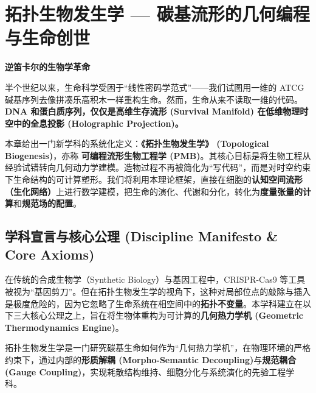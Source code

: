 \chapter{拓扑生物发生学 — 碳基流形的几何编程与生命创世}
\label{chp:topological_biogenesis}

\begin{bquote}
    \textbf{逆笛卡尔的生物学革命}

    \vspace{1em}半个世纪以来，生命科学受困于“线性密码学范式”——我们试图用一维的 ATCG 碱基序列去像拼凑乐高积木一样重构生命。然而，生命从来不读取一维的代码。\textbf{DNA 和蛋白质序列，仅仅是高维生存流形 (Survival Manifold) 在低维物理时空中的全息投影 (Holographic Projection)。}

    \vspace{1em}本章给出一门新学科的系统化定义：\textbf{《拓扑生物发生学》 (Topological Biogenesis)}，亦称 \textbf{可编程流形生物工程学 (PMB)}。其核心目标是将生物工程从经验试错转向几何动力学建模。造物过程不再被简化为“写代码”，而是对时空约束下生命结构的可计算塑形。我们将利用本理论框架，直接在细胞的\textbf{认知空间流形（生化网络）}上进行数学建模，把生命的演化、代谢和分化，转化为\textbf{度量张量的计算}和\textbf{规范场的配置}。
\end{bquote}

\section{学科宣言与核心公理 (Discipline Manifesto \& Core Axioms)}
\label{sec:tb_axioms}

在传统的合成生物学（Synthetic Biology）与基因工程中，CRISPR-Cas9 等工具被视为“基因剪刀”。但在拓扑生物发生学的视角下，这种对局部位点的敲除与插入是极度危险的，因为它忽略了生命系统在相空间中的\textbf{拓扑不变量}。本学科建立在以下三大核心公理之上，旨在将生物体重构为可计算的\textbf{几何热力学机 (Geometric Thermodynamics Engine)}。


\begin{definition}[拓扑生物发生学]
    拓扑生物发生学是一门研究碳基生命如何作为“几何热力学机”，在物理环境的严格约束下，通过内部的\textbf{形质解耦 (Morpho-Semantic Decoupling)}与\textbf{规范耦合 (Gauge Coupling)}，实现耗散结构维持、细胞分化与系统演化的先验工程学科。
\end{definition}


